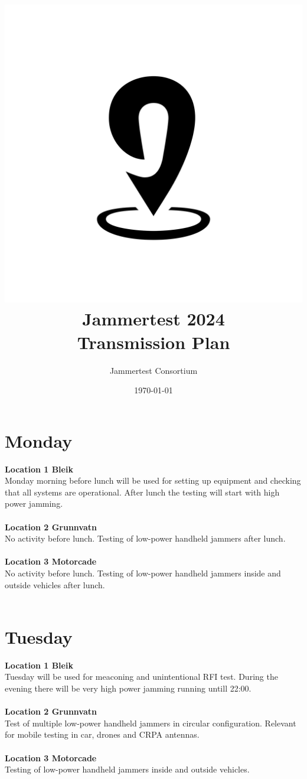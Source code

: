 \documentclass[a4paper]{book}
\title{\includegraphics[scale=0.2]{graphics/jampin.png}\\ Jammertest 2024 \\ \huge{Transmission Plan}}
\author{Jammertest Consortium}
\date{\today \\ \DTMcurrenttime}
\begin{document}
\maketitle

\tableofcontents
\restoregeometry

\begin{landscape}

\chapter{Monday}
\Large \textbf{Location 1 Bleik} \\
Monday morning before lunch will be used for setting up equipment and checking that all systems are operational. After lunch the testing will start with high power jamming.\\ \\
\Large \textbf{Location 2 Grunnvatn} \\
No activity before lunch. Testing of low-power handheld jammers after lunch.\\ \\
\Large \textbf{Location 3 Motorcade} \\
No activity before lunch. Testing of low-power handheld jammers inside and outside vehicles after lunch.\\ \\

%

\chapter{Tuesday}
\Large \textbf{Location 1 Bleik} \\
Tuesday will be used for meaconing and unintentional RFI test. During the evening there will be very high power jamming running untill 22:00.\\ \\
\Large \textbf{Location 2 Grunnvatn} \\ 
Test of multiple low-power handheld jammers in circular configuration. Relevant for mobile testing in car, drones and CRPA antennas.\\ \\ 
\Large \textbf{Location 3 Motorcade} \\
Testing of low-power handheld jammers inside and outside vehicles.\\ \\

%


\end{landscape}
\end{document}
